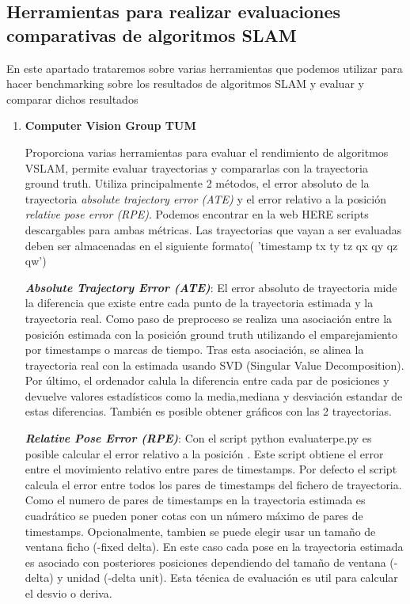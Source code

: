 \subsection{Herramientas para realizar evaluaciones comparativas de algoritmos SLAM}
En este apartado trataremos sobre varias herramientas que podemos utilizar para hacer benchmarking sobre los resultados de algoritmos SLAM y evaluar y comparar dichos resultados

\begin {enumerate}
\item\textbf{Computer Vision Group TUM}

Proporciona varias herramientas para evaluar el rendimiento de algoritmos VSLAM, permite evaluar trayectorias y compararlas con la trayectoria ground truth.\cite{sturm12iros}
Utiliza principalmente 2 métodos, el error absoluto de la trayectoria \textit{absolute trajectory error (ATE)} y el error relativo a la posición \textit{relative pose error (RPE)}. Podemos encontrar en la web HERE scripts descargables para ambas métricas.
Las trayectorias que vayan a ser evaluadas deben ser almacenadas en el siguiente formato( 'timestamp tx ty tz qx qy qz qw')


 \textbf{\textit{Absolute Trajectory Error (ATE)}}:
 El error absoluto de trayectoria mide la diferencia que existe entre cada punto de la trayectoria estimada y la trayectoria real. Como paso de preproceso se realiza una asociación entre la posición estimada con la posición ground truth utilizando el emparejamiento por timestamps o marcas de tiempo. Tras esta asociación, se alinea la trayectoria real con la estimada usando SVD (Singular Value Decomposition). Por último, el ordenador calula la diferencia entre cada par de posiciones y devuelve valores estadísticos como la media,mediana y desviación estandar de estas diferencias. También es posible obtener gráficos con las 2 trayectorias.

\textbf{\textit{Relative Pose Error (RPE)}}: 
Con el script python evaluaterpe.py es posible calcular el error relativo a la posición . Este script obtiene el error entre el movimiento relativo entre pares de timestamps. Por defecto el script calcula el error entre todos los pares de timestamps del fichero de trayectoria. Como el numero de pares de timestamps en la trayectoria estimada es cuadrático se pueden poner cotas con un número máximo de pares de timestamps. Opcionalmente, tambien se puede elegir usar un tamaño de ventana ficho (-fixed delta). En este caso cada pose en la trayectoria estimada es asociado con posteriores posiciones dependiendo del tamaño de ventana (-delta) y unidad (-delta unit). Esta técnica de evaluación es util para calcular el desvio o deriva.




\end{enumerate}
